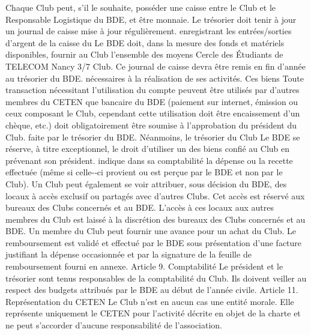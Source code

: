\documentclass{article} %
\begin{document}
\begin{multicols}{2}
Chaque   Club   peut,   s’il   le   souhaite,   posséder   une   caisse   entre   le   Club   et   le   Responsable   Logistique   du   BDE,   et   être  
monnaie.  Le  trésorier  doit  tenir  à  jour  un  journal  de  caisse   mise  à  jour  régulièrement.  
enregistrant   les   entrées/sorties   d’argent   de   la   caisse   du  
Le   BDE   doit,   dans   la   mesure   des   fonds   et   matériels   disponibles,   fournir   au   Club   l’ensemble   des   moyens  
                  Cercle  des  Étudiants  de  TELECOM  Nancy   3/7   Club.  Ce  journal  de  caisse  devra  être  remis  en  fin  d’année  au   trésorier  du  BDE.  
nécessaires   à   la   réalisation   de   ses   activités.   Ces   biens  
Toute   transaction   nécessitant   l’utilisation   du   compte   peuvent   être   utilisés   par   d’autres   membres   du   CETEN   que  
bancaire   du   BDE   (paiement   sur   internet,   émission   ou   ceux  composant  le  Club,  cependant  cette  utilisation  doit  être  
encaissement   d’un   chèque,   etc.)   doit   obligatoirement   être   soumise  à  l’approbation  du  président  du  Club.  
faite  par  le  trésorier  du  BDE.  Néanmoins,  le  trésorier  du  Club  
Le  BDE  se  réserve,  à  titre  exceptionnel,  le  droit  d’utiliser  un   des  biens  confié  au  Club  en  prévenant  son  président.  
indique   dans   sa   comptabilité   la   dépense   ou   la   recette   effectuée  (même  si  celle-­‐ci  provient  ou  est  perçue  par  le  BDE   et  non  par  le  Club).  
Un  Club  peut  également  se  voir  attribuer,  sous  décision  du   BDE,   des   locaux   à   accès   exclusif   ou   partagés   avec   d’autres   Clubs.   Cet   accès   est   réservé   aux   bureaux   des   Clubs   concernés   et   au   BDE.   L’accès   à   ces   locaux   aux   autres   membres  du  Club  est  laissé  à  la  discrétion  des  bureaux  des   Clubs  concernés  et  au  BDE.  
Un  membre  du  Club  peut  fournir  une  avance  pour  un  achat   du  Club.  Le  remboursement  est  validé  et  effectué  par  le  BDE   sous   présentation   d’une   facture   justifiant   la   dépense   occasionnée   et   par   la   signature   de   la   feuille   de   remboursement  fourni  en  annexe.  
Article  9. Comptabilité   Le   président   et   le   trésorier   sont   tenus   responsables   de   la   comptabilité   du   Club.   Ils   doivent   veiller   au   respect   des   budgets  attribués  par  le  BDE  au  début  de  l’année  civile.  
Article  11. Représentation  du  CETEN   Le   Club   n’est   en   aucun   cas   une   entité   morale.   Elle   représente   uniquement   le   CETEN   pour   l’activité   décrite   en   objet   de   la   charte   et   ne   peut   s’accorder   d’aucune   responsabilité  de  l’association.  

\end{multicols}
\end{document}
